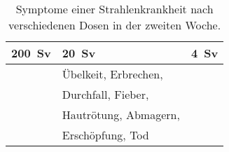 \begin{table}
	\caption{Symptome einer Strahlenkrankheit nach verschiedenen Dosen in der zweiten Woche.\cite{AnnuRev18_2}}
	\begin{tabular}{lll}
		\toprule
 		\SI{200}{\sievert} & \SI{20}{\sievert}& \SI{4}{\sievert}\\
		\midrule
		\phantom{Hautrötung, Desorientierung,} & Übelkeit, Erbrechen, 	&	\\
		& Durchfall, Fieber, 		&	\phantom{Hautrötung, Desorientierung,} \\
		& Hautrötung, Abmagern,	&	\\
		& Erschöpfung, Tod			&	\\
	\end{tabular}
\end{table}
